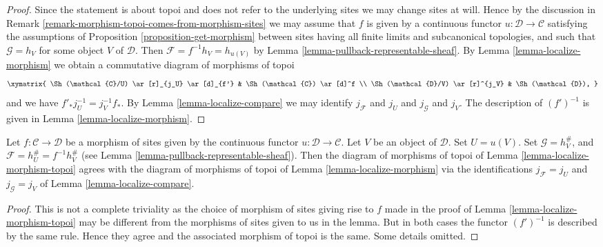 \begin{proof}
Since the statement is about topoi and does not refer to the underlying
sites we may change sites at will. Hence by the discussion in
Remark \ref{remark-morphism-topoi-comes-from-morphism-sites}
we may assume that $f$ is given by a continuous functor
$u : \mathcal{D} \to \mathcal{C}$ satisfying the assumptions of
Proposition \ref{proposition-get-morphism}
between sites having all finite limits and subcanonical topologies,
and such that $\mathcal{G} = h_V$ for some object $V$ of
$\mathcal{D}$. Then $\mathcal{F} = f^{-1}h_V = h_{u(V)}$ by
Lemma \ref{lemma-pullback-representable-sheaf}.
By
Lemma \ref{lemma-localize-morphism}
we obtain a commutative diagram of morphisms of topoi
$$
\xymatrix{
\Sh(\mathcal{C}/U) \ar[r]_{j_U} \ar[d]_{f'} &
\Sh(\mathcal{C}) \ar[d]^f \\
\Sh(\mathcal{D}/V) \ar[r]^{j_V} &
\Sh(\mathcal{D}),
}
$$
and we have $f'_*j_U^{-1} = j_V^{-1}f_*$. By
Lemma \ref{lemma-localize-compare}
we may identify $j_\mathcal{F}$ and $j_U$
and $j_\mathcal{G}$ and $j_V$. The description of $(f')^{-1}$
is given in
Lemma \ref{lemma-localize-morphism}.
\end{proof}

\begin{lemma}
\label{lemma-localize-morphism-compare}
Let $f : \mathcal{C} \to \mathcal{D}$ be a morphism of sites given
by the continuous functor $u : \mathcal{D} \to \mathcal{C}$.
Let $V$ be an object of $\mathcal{D}$. Set $U = u(V)$.
Set $\mathcal{G} = h_V^\#$, and
$\mathcal{F} = h_U^\# = f^{-1}h_V^\#$ (see
Lemma \ref{lemma-pullback-representable-sheaf}).
Then the diagram of morphisms of topoi of
Lemma \ref{lemma-localize-morphism-topoi}
agrees with the diagram of morphisms of topoi of
Lemma \ref{lemma-localize-morphism}
via the identifications $j_\mathcal{F}= j_U$
and $j_\mathcal{G} = j_V$ of
Lemma \ref{lemma-localize-compare}.
\end{lemma}

\begin{proof}
This is not a complete triviality as the choice of morphism of sites
giving rise to $f$ made in the proof of
Lemma \ref{lemma-localize-morphism-topoi}
may be different from the morphisms of sites given to us in the lemma.
But in both cases the functor $(f')^{-1}$ is described by the same
rule. Hence they agree and the associated morphism of topoi is the same.
Some details omitted.
\end{proof}

